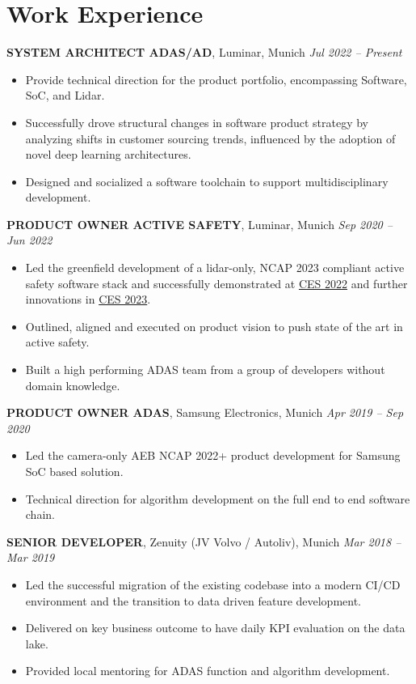 \documentclass[10pt,a4paper]{article}
\begin{document}
\section*{Work Experience}

\textbf{SYSTEM ARCHITECT ADAS/AD}, Luminar, Munich \hfill \textit{Jul 2022 – Present}\\
\begin{itemize}[leftmargin=*]
    \item Provide technical direction for the product portfolio, encompassing Software, SoC, and Lidar.
    \item Successfully drove structural changes in software product strategy by analyzing shifts in customer sourcing trends, influenced by the adoption of novel deep learning architectures.
    \item Designed and socialized a software toolchain to support multidisciplinary development.
\end{itemize}

\textbf{PRODUCT OWNER ACTIVE SAFETY}, Luminar, Munich \hfill \textit{Sep 2020 – Jun 2022}\\
\begin{itemize}[leftmargin=*]
    \item Led the greenfield development of a lidar-only, NCAP 2023 compliant active safety software stack and successfully demonstrated at \href{https://ces.tech}{CES 2022} and further innovations in \href{https://ces.tech}{CES 2023}.
    \item Outlined, aligned and executed on product vision to push state of the art in active safety.
    \item Built a high performing ADAS team from a group of developers without domain knowledge.
\end{itemize}

\textbf{PRODUCT OWNER ADAS}, Samsung Electronics, Munich \hfill \textit{Apr 2019 – Sep 2020}\\
\begin{itemize}[leftmargin=*]
    \item Led the camera-only AEB NCAP 2022+ product development for Samsung SoC based solution.
    \item Technical direction for algorithm development on the full end to end software chain.
\end{itemize}

\textbf{SENIOR DEVELOPER}, Zenuity (JV Volvo / Autoliv), Munich \hfill \textit{Mar 2018 – Mar 2019}\\
\begin{itemize}[leftmargin=*]
    \item Led the successful migration of the existing codebase into a modern CI/CD environment and the transition to data driven feature development.
    \item Delivered on key business outcome to have daily KPI evaluation on the data lake.
    \item Provided local mentoring for ADAS function and algorithm development.
\end{itemize}
\end{document}
